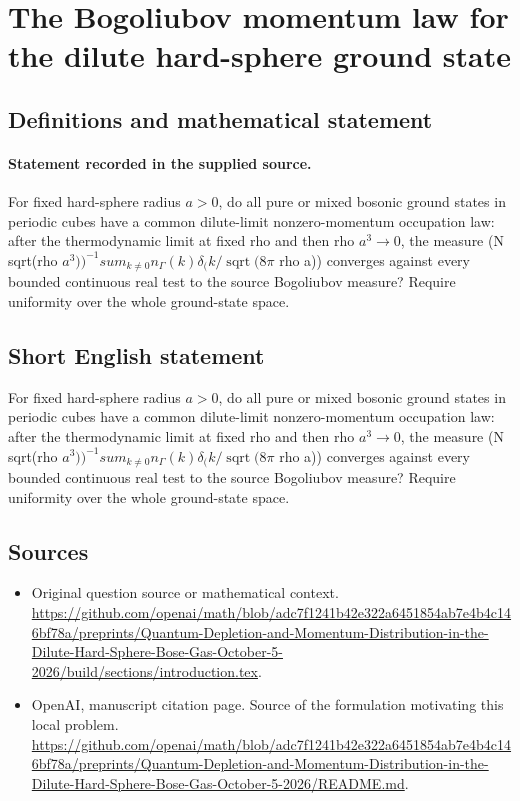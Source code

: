 \documentclass[11pt]{article}
\begin{document}
\section*{The Bogoliubov momentum law for the dilute hard-sphere ground state}\label{statement}
\subsection{Definitions and mathematical statement}
\paragraph{Statement recorded in the supplied source.}
For fixed hard-sphere radius $a>0$, do all pure or mixed bosonic ground states in periodic cubes have a common dilute-limit nonzero-momentum occupation law: after the thermodynamic limit at fixed rho and then rho $a^3\to 0$, the measure (N sqrt(rho $a^3))^{-1}sum_{k\neq 0}n_\Gamma (k)\delta _(k/\operatorname{sqrt}(8\pi $ rho a)) converges against every bounded continuous real test to the source Bogoliubov measure? Require uniformity over the whole ground-state space.
\subsection{Short English statement}
For fixed hard-sphere radius $a>0$, do all pure or mixed bosonic ground states in periodic cubes have a common dilute-limit nonzero-momentum occupation law: after the thermodynamic limit at fixed rho and then rho $a^3\to 0$, the measure (N sqrt(rho $a^3))^{-1}sum_{k\neq 0}n_\Gamma (k)\delta _(k/\operatorname{sqrt}(8\pi $ rho a)) converges against every bounded continuous real test to the source Bogoliubov measure? Require uniformity over the whole ground-state space.
\subsection{Sources}
\begin{itemize}
\item[S1] Original question source or mathematical context.
\url{https://github.com/openai/math/blob/adc7f1241b42e322a6451854ab7e4b4c146bf78a/preprints/Quantum-Depletion-and-Momentum-Distribution-in-the-Dilute-Hard-Sphere-Bose-Gas-October-5-2026/build/sections/introduction.tex}.
\item[S2] OpenAI, manuscript citation page. Source of the formulation motivating this local problem.
\url{https://github.com/openai/math/blob/adc7f1241b42e322a6451854ab7e4b4c146bf78a/preprints/Quantum-Depletion-and-Momentum-Distribution-in-the-Dilute-Hard-Sphere-Bose-Gas-October-5-2026/README.md}.
\end{itemize}
\end{document}
